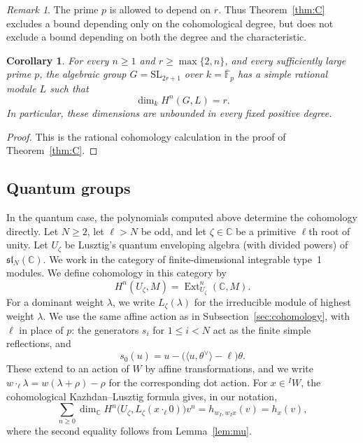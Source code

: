 \documentclass[11pt,a4paper,reqno]{amsart}
\numberwithin{equation}{section}
\newtheorem{corollary}[theorem]{Corollary}
\theoremstyle{definition}
\theoremstyle{remark}
\newtheorem{remark}[theorem]{Remark}
\theoremstyle{plain}
\begin{document}
\begin{remark}
The prime $p$ is allowed to depend on $r$.
Thus Theorem~\ref{thm:C} excludes a bound depending only
on the cohomological degree, but does not exclude a bound
depending on both the degree and the characteristic.
\end{remark}

\begin{corollary}\label{cor:algebraic-cohomology}
For every $n\geq1$ and $r\geq\max\{2,n\}$, and every
sufficiently large prime $p$, the algebraic group
$G=\mathrm{SL}_{2r+1}$ over $k=\overline{\mathbb F}_p$
has a simple rational module $L$ such that
\[
\dim_k H^n(G,L)=r.
\]
In particular, these dimensions are unbounded in every
fixed positive degree.
\end{corollary}

\begin{proof}
This is the rational cohomology calculation in the
proof of Theorem~\ref{thm:C}.
\end{proof}

\subsection{Quantum groups}\label{subsec:quantum}

In the quantum case, the polynomials computed above determine
the cohomology directly.
%
Let $N\geq2$, let $\ell>N$ be odd, and let
$\zeta\in\mathbb C$ be a primitive $\ell$th root of unity.
Let $U_\zeta$ be Lusztig's quantum enveloping algebra
(with divided powers) of $\mathfrak{sl}_N(\mathbb C)$.
We work in the category of finite-dimensional integrable
type~1 modules.
We define cohomology in this category by
\[
H^n(U_\zeta,M)=
\operatorname{Ext}^n_{U_\zeta}(\mathbb C,M).
\]
For a dominant weight $\lambda$, we write $L_\zeta(\lambda)$
for the irreducible module of highest weight $\lambda$.
We use the same affine action as in
Subsection~\ref{sec:cohomology}, with $\ell$ in place of $p$:
the generators $s_i$ for $1\leq i<N$ act as the finite
simple reflections, and
\[
s_0(u)=u-\bigl(\langle u,\theta^\vee\rangle-\ell\bigr)\theta.
\]
These extend to an action of $W$ by affine transformations, and we write
$w\cdot_\ell\lambda=w(\lambda+\rho)-\rho$ for the corresponding dot action.
%
For $x\in{}^IW$, the cohomological Kazhdan--Lusztig formula
\cite[(2.3.1)]{Ko2019} gives, in our notation,
\begin{equation}\label{eq:quantum-cohomology}
\textstyle \sum_{n\geq0}
\dim_{\mathbb C}H^n
\bigl(U_\zeta,L_\zeta(x\cdot_\ell0)\bigr)v^n
=h_{w_I,w_Ix}(v)=h_x(v),
\end{equation}
where the second equality follows from Lemma~\ref{lem:mu}.
\end{document}
